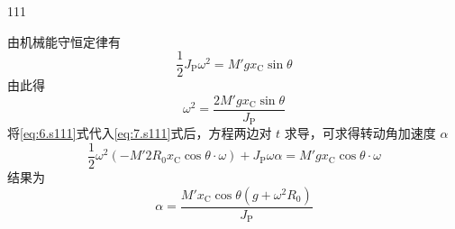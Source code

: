 \begin{solution}{111}
\begin{subsolution}
        由机械能守恒定律有
        \begin{equation}
            \frac{1}{2} J_{\mathrm{P}} \omega^{2} = M' g x_{\mathrm{C}} \sin\theta
            \label{eq:7.s111}
        \end{equation}
        由此得
        \begin{equation}
            \omega^{2} = \frac{2 M' g x_{\mathrm{C}} \sin\theta}{J_{\mathrm{P}}}
        \end{equation}
        将\eqref{eq:6.s111}式代入\eqref{eq:7.s111}式后，方程两边对 $t$ 求导，可求得转动角加速度 $\alpha$
        \begin{equation}
            \frac{1}{2} \omega^{2} (- M' 2 R_{0} x_{\mathrm{C}} \cos\theta \cdot \omega) + J_{\mathrm{P}} \omega \alpha = M' g x_{\mathrm{C}} \cos\theta \cdot \omega
        \end{equation}
        结果为
        \begin{equation}
            \alpha = \frac{M' x_{\mathrm{C}} \cos\theta (g + \omega^{2} R_{0})}{J_{\mathrm{P}}}
            \label{eq:8.s111}
        \end{equation}


\end{subsolution}
\end{solution}
